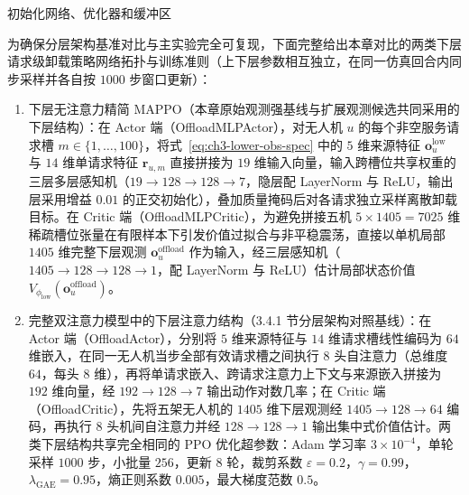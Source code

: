 \begin{algorithm}[!htbp]
 \caption{上层 Attention-MAPPO 的概率与执行一致训练流程}
 \label{alg:upper-mappo}
 初始化网络、优化器和缓冲区\;
\end{algorithm}

为确保分层架构基准对比与主实验完全可复现，下面完整给出本章对比的两类下层请求级卸载策略网络拓扑与训练准则（上下层参数相互独立，在同一仿真回合内同步采样并各自按 $1000$ 步窗口更新）：
\begin{enumerate}
\item 下层无注意力精简 MAPPO（本章原始观测强基线与扩展观测候选共同采用的下层结构）：在 Actor 端（OffloadMLPActor），对无人机 $u$ 的每个非空服务请求槽 $m\in\{1,\ldots,100\}$，将式~\eqref{eq:ch3-lower-obs-spec} 中的 $5$ 维来源特征 $\mathbf{o}_u^{\mathrm{low}}$ 与 $14$ 维单请求特征 $\mathbf{r}_{u,m}$ 直接拼接为 $19$ 维输入向量，输入跨槽位共享权重的三层多层感知机（$19\to 128\to 128\to 7$，隐层配 LayerNorm 与 ReLU，输出层采用增益 $0.01$ 的正交初始化），叠加质量掩码后对各请求独立采样离散卸载目标。在 Critic 端（OffloadMLPCritic），为避免拼接五机 $5\times 1405=7025$ 维稀疏槽位张量在有限样本下引发价值过拟合与非平稳震荡，直接以单机局部 $1405$ 维完整下层观测 $\mathbf{o}_u^{\mathrm{offload}}$ 作为输入，经三层感知机（$1405\to 128\to 128\to 1$，配 LayerNorm 与 ReLU）估计局部状态价值 $V_{\phi_{\mathrm{low}}}(\mathbf{o}_u^{\mathrm{offload}})$。
\item 完整双注意力模型中的下层注意力结构（3.4.1 节分层架构对照基线）：在 Actor 端（OffloadActor），分别将 $5$ 维来源特征与 $14$ 维请求槽线性编码为 $64$ 维嵌入，在同一无人机当步全部有效请求槽之间执行 $8$ 头自注意力（总维度 $64$，每头 $8$ 维），再将单请求嵌入、跨请求注意力上下文与来源嵌入拼接为 $192$ 维向量，经 $192\to 128\to 7$ 输出动作对数几率；在 Critic 端（OffloadCritic），先将五架无人机的 $1405$ 维下层观测经 $1405\to 128\to 64$ 编码，再执行 $8$ 头机间自注意力并经 $128\to 128\to 1$ 输出集中式价值估计。两类下层结构共享完全相同的 PPO 优化超参数：Adam 学习率 $3\times 10^{-4}$，单轮采样 $1000$ 步，小批量 $256$，更新 $8$ 轮，裁剪系数 $\varepsilon=0.2$，$\gamma=0.99$，$\lambda_{\mathrm{GAE}}=0.95$，熵正则系数 $0.005$，最大梯度范数 $0.5$。
\end{enumerate}

